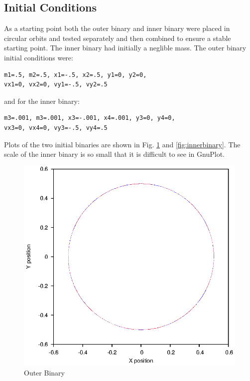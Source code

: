 \documentclass[a4paper,12pt]{article}
\begin{document}
\subsection{Initial Conditions}
As a starting point both the outer binary and inner binary were placed in circular orbits and tested separately and then combined to ensure a stable
starting point. The inner binary had initially a neglible mass.
The outer binary initial conditions were:
\begin{lstlisting}
m1=.5, m2=.5, x1=-.5, x2=.5, y1=0, y2=0,
vx1=0, vx2=0, vy1=-.5, vy2=.5
\end{lstlisting}
and for the inner binary:
\begin{lstlisting}
m3=.001, m3=.001, x3=-.001, x4=.001, y3=0, y4=0, 
vx3=0, vx4=0, vy3=-.5, vy4=.5
\end{lstlisting}
Plots of the two initial binaries are shown in Fig. \ref{fig:outerbinary} and 
\ref{fig:innerbinary}. The scale of the inner binary is so small that it is difficult
to see in GnuPlot.
\begin{figure}[H]
\centering
\includegraphics[width=.9\textwidth]{./results/outerbinary/Orbit.eps}
\caption{Outer Binary}
\label{fig:outerbinary}
\end{figure}
\end{document}
